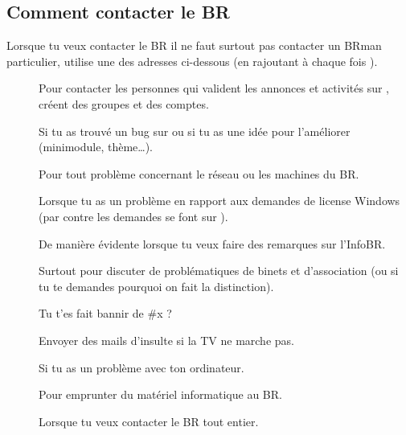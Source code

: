 \subsection{Comment contacter le BR}

Lorsque tu veux contacter le BR il ne faut surtout pas contacter un BRman particulier, utilise une des adresses ci-dessous (en rajoutant à chaque fois ).

\begin{description}

\item[] Pour contacter les personnes qui valident les annonces et activités sur \fkz, créent des groupes et des comptes.

\item[] Si tu as trouvé un bug sur \fkz ou si tu as une idée pour l'améliorer (minimodule, thème\dots).

\item[] Pour tout problème concernant le réseau ou les machines du BR.

\item[] Lorsque tu as un problème en rapport aux demandes de license Windows (par contre les demandes se font sur \fkz).

\item[] De manière évidente lorsque tu veux faire des remarques sur l'InfoBR.

\item[] Surtout pour discuter de problématiques de binets et d'association (ou si tu te demandes pourquoi on fait la distinction). 

\item[] Tu t'es fait bannir de \#x ?

\item[] Envoyer des mails d'insulte si la TV ne marche pas.

\item[] Si tu as un problème avec ton ordinateur.

\item[] Pour emprunter du matériel informatique au BR.

\item[] Lorsque tu veux contacter le BR tout entier.

\end{description}
